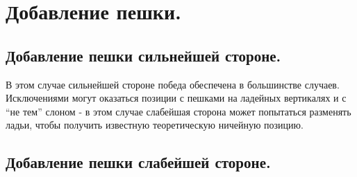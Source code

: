 \section{Добавление пешки.}%

\subsection{Добавление пешки сильнейшей стороне.}

В этом случае сильнейшей стороне победа обеспечена в большинстве случаев. Исключениями могут оказаться позиции с пешками на ладейных вертикалях и с ``не тем'' слоном - в этом случае слабейшая сторона может попытаться разменять ладьи, чтобы получить известную теоретическую ничейную позицию.

\subsection{Добавление пешки слабейшей стороне.}

\pagebreak
